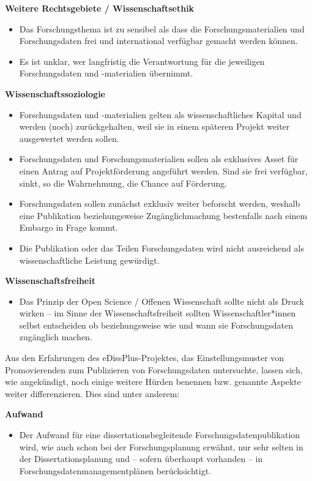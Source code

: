 \documentclass[a4paper,
fontsize=11pt,
oneside,
numbers=noperiodatend,
parskip=half-,
bibliography=totoc,
final
]{scrartcl}
\begin{document}
\textbf{Weitere Rechtsgebiete / Wissenschaftsethik}

\begin{itemize}
\item
  Das Forschungsthema ist zu sensibel als dass die Forschungsmaterialien
  und Forschungsdaten frei und international verfügbar gemacht werden
  können.
\item
  Es ist unklar, wer langfristig die Verantwortung für die jeweiligen
  Forschungsdaten und -materialien übernimmt.
\end{itemize}

\textbf{Wissenschaftssoziologie}

\begin{itemize}
\item
  Forschungsdaten und -materialien gelten als wissenschaftliches Kapital
  und werden (noch) zurückgehalten, weil sie in einem späteren Projekt
  weiter ausgewertet werden sollen.
\item
  Forschungsdaten und Forschungsmaterialien sollen als exklusives Asset
  für einen Antrag auf Projektförderung angeführt werden. Sind sie frei
  verfügbar, sinkt, so die Wahrnehmung, die Chance auf Förderung.
\item
  Forschungsdaten sollen zunächst exklusiv weiter beforscht werden,
  weshalb eine Publikation beziehungsweise Zugänglichmachung bestenfalls
  nach einem Embargo in Frage kommt.
\item
  Die Publikation oder das Teilen Forschungsdaten wird nicht ausreichend
  als wissenschaftliche Leistung gewürdigt.
\end{itemize}

\textbf{Wissenschaftsfreiheit}

\begin{itemize}
\tightlist
\item
  Das Prinzip der Open Science / Offenen Wissenschaft sollte nicht als
  Druck wirken -- im Sinne der Wissenschaftsfreiheit sollten
  Wissenschaftler*innen selbst entscheiden ob beziehungsweise wie und
  wann sie Forschungsdaten zugänglich machen.
\end{itemize}

Aus den Erfahrungen des eDissPlus-Projektes, das Einstellungsmuster von
Promovierenden zum Publizieren von Forschungsdaten untersuchte, lassen
sich, wie angekündigt, noch einige weitere Hürden benennen bzw. genannte
Aspekte weiter differenzieren. Dies sind unter anderem:

\textbf{Aufwand}

\begin{itemize}
\tightlist
\item
  Der Aufwand für eine dissertationsbegleitende
  Forschungsdatenpublikation wird, wie auch schon bei der
  Forschungsplanung erwähnt, nur sehr selten in der Dissertationsplanung
  und -- sofern überhaupt vorhanden -- in
  Forschungsdatenmanagementplänen berücksichtigt.
\end{itemize}
\end{document}
